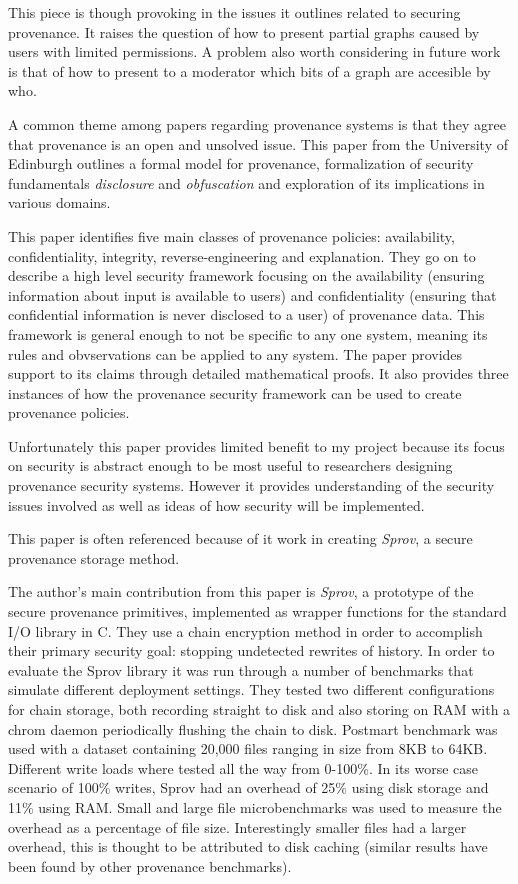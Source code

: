 This piece is though provoking in the issues it outlines related to securing provenance. It raises the question of how to present partial graphs caused by users with limited permissions. A problem also worth considering in future work is that of how to present to a moderator which bits of a graph are accesible by who.


A common theme among papers regarding provenance systems is that they agree that provenance is an open and unsolved issue. This paper from the University of Edinburgh outlines a formal model for provenance, formalization of security fundamentals \textit{disclosure} and \textit{obfuscation} and exploration of its implications in various domains.

This paper identifies five main classes of provenance policies: availability, confidentiality, integrity, reverse-engineering and explanation. They go on to describe a high level security framework focusing on the availability (ensuring information about input is available to users) and confidentiality (ensuring that confidential information is never disclosed to a user) of provenance data. This framework is general enough to not be specific to any one system, meaning its rules and obvservations can be applied to any system. The paper provides support to its claims through detailed mathematical proofs. It also provides three instances of how the provenance security framework can be used to create provenance policies.

Unfortunately this paper provides limited benefit to my project because its focus on security is abstract enough to be most useful to researchers designing provenance security systems. However it provides understanding of the security issues involved as well as ideas of how security will be implemented. 


This paper is often referenced because of it work in creating \textit{Sprov}, a secure provenance storage method. 

The author's main contribution from this paper is \textit{Sprov}, a prototype of the secure provenance primitives, implemented as wrapper functions for the standard I/O library in C. They use a chain encryption method in order to accomplish their primary security goal: stopping undetected rewrites of history. In order to evaluate the Sprov library it was run through a number of benchmarks that simulate different deployment settings. They tested two different configurations for chain storage, both recording straight to disk and also storing on RAM with a chrom daemon periodically flushing the chain to disk. Postmart benchmark was used with a dataset containing 20,000 files ranging in size from 8KB to 64KB. Different write loads where tested all the way from 0-100\%. In its worse case scenario of 100\% writes, Sprov had an overhead of 25\% using disk storage and 11\% using RAM. Small and large file microbenchmarks was used to measure the overhead as a percentage of file size. Interestingly smaller files had a larger overhead, this is thought to be attributed to disk caching (similar results have been found by other provenance benchmarks).

